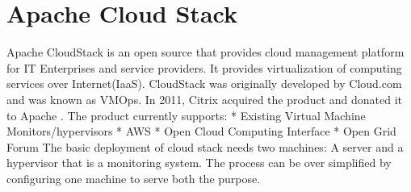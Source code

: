 \section{Apache Cloud Stack}

Apache CloudStack is an open source that provides cloud management platform for IT Enterprises and service providers. It provides virtualization of computing services over Internet(IaaS)\cite{ hid-sp18-417-techtarget-cloudStack}. CloudStack was originally developed by Cloud.com and was known as VMOps. In 2011, Citrix acquired the product and donated it to Apache \cite{ hid-sp18-417-wiki-cloudstack}. The product currently supports:
*        Existing Virtual Machine Monitors/hypervisors
*        AWS
*        Open Cloud Computing Interface
*        Open Grid Forum
 The basic deployment of cloud stack needs two machines: A server and a hypervisor that is a monitoring system. The process can be over simplified by configuring one machine to serve both the purpose.\cite{ hid-sp18-417-doc-cloudstack}
